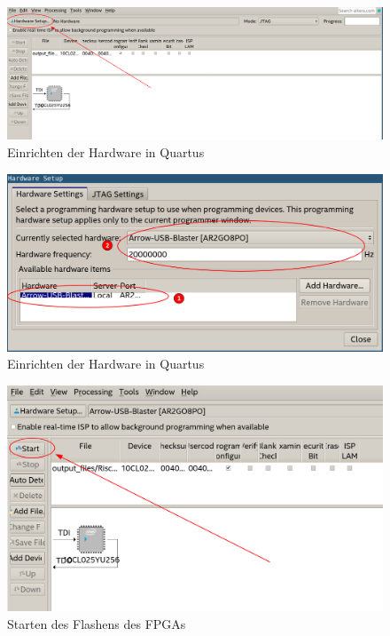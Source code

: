     \begin{figure}[H]
        \centering
        \includegraphics[scale=0.6]{img/quartus_programmer_select_hardware.png}
        \caption{Einrichten der Hardware in Quartus}
        \label{fig:quartus_programmer_window}
    \end{figure}

    \begin{figure}[H]
        \centering
        \includegraphics[scale=0.6]{img/quartus_programmer_select_hardware2.png}
        \caption{Einrichten der Hardware in Quartus}
        \label{fig:quartus_programmer_select_hardware}
    \end{figure}

    \begin{figure}[H]
        \centering
        \includegraphics[scale=0.6]{img/quartus_programmer_start.png}
        \caption{Starten des Flashens des FPGAs}
        \label{fig:quartus_programmer_start}
    \end{figure}


